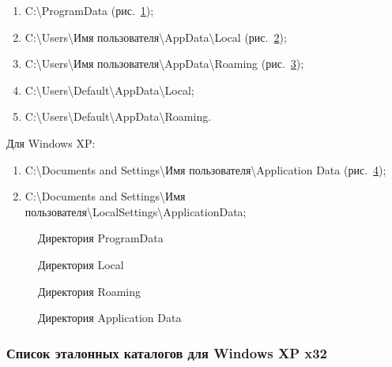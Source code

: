 \begin{enumerate}
  \item C:\textbackslash ProgramData (рис.~\ref{kucher_5:kucher_5});
  \item C:\textbackslash Users\textbackslash Имя пользователя\textbackslash AppData\textbackslash Local (рис.~\ref{kucher_6:kucher_6});
  \item C:\textbackslash Users\textbackslash Имя пользователя\textbackslash AppData\textbackslash Roaming (рис.~\ref{kucher_7:kucher_7});
  \item C:\textbackslash Users\textbackslash Default\textbackslash AppData\textbackslash Local;
  \item C:\textbackslash Users\textbackslash Default\textbackslash AppData\textbackslash Roaming.
\end{enumerate}


Для Windows XP:

\begin{enumerate}
  \item C:\textbackslash Documents and Settings\textbackslash Имя пользователя\textbackslash Application Data (рис.~\ref{kucher_8:kucher_8});
  \item C:\textbackslash Documents and Settings\textbackslash Имя пользователя\textbackslash LocalSettings\textbackslash ApplicationData;
\end{enumerate}

\begin{figure}[h!]
\caption{Директория ProgramData}
\label{kucher_5:kucher_5}
\end{figure} 

\begin{figure}[h!]
\caption{Директория Local}
\label{kucher_6:kucher_6}
\end{figure} 

\begin{figure}[h!]
\caption{Директория Roaming}
\label{kucher_7:kucher_7}
\end{figure} 

\begin{figure}[h!]
\caption{Директория Application Data}
\label{kucher_8:kucher_8}
\end{figure} 

\clearpage
\subsubsection{Список эталонных каталогов для Windows XP x32}


